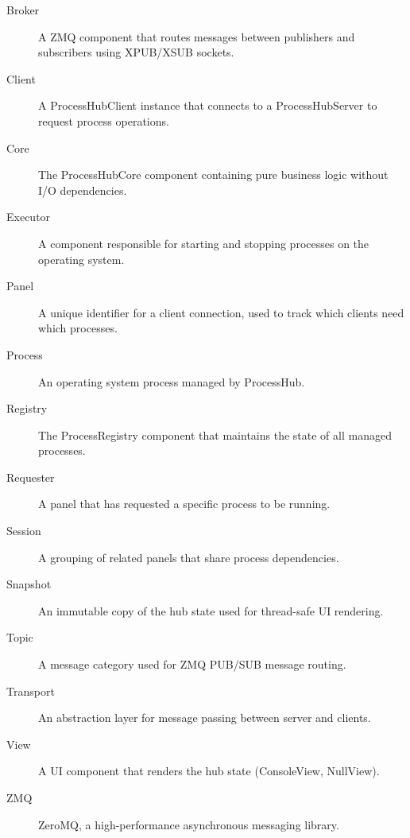 \begin{description}

\item[Broker] A ZMQ component that routes messages between publishers and subscribers using XPUB/XSUB sockets.

\item[Client] A ProcessHubClient instance that connects to a ProcessHubServer to request process operations.

\item[Core] The ProcessHubCore component containing pure business logic without I/O dependencies.

\item[Executor] A component responsible for starting and stopping processes on the operating system.

\item[Panel] A unique identifier for a client connection, used to track which clients need which processes.

\item[Process] An operating system process managed by ProcessHub.

\item[Registry] The ProcessRegistry component that maintains the state of all managed processes.

\item[Requester] A panel that has requested a specific process to be running.

\item[Session] A grouping of related panels that share process dependencies.

\item[Snapshot] An immutable copy of the hub state used for thread-safe UI rendering.

\item[Topic] A message category used for ZMQ PUB/SUB message routing.

\item[Transport] An abstraction layer for message passing between server and clients.

\item[View] A UI component that renders the hub state (ConsoleView, NullView).

\item[ZMQ] ZeroMQ, a high-performance asynchronous messaging library.

\end{description}

